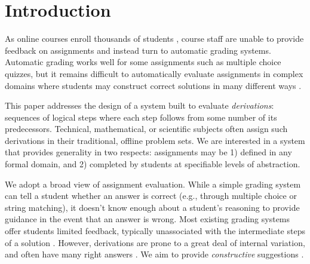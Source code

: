 \documentclass{sigchi}
\begin{document}








 

\section{Introduction}
As online courses enroll thousands of students \cite{enroll}, course staff are unable to provide feedback on assignments and instead turn to automatic grading systems. Automatic grading works well for some assignments such as multiple choice quizzes, but it remains difficult to automatically evaluate assignments in complex domains where students may construct correct solutions in many different ways \cite{automated-scoring-design, automated-grading}. 

This paper addresses the design of a system built to evaluate \textit{derivations}: sequences of logical steps where each step follows from some number of its predecessors. Technical, mathematical, or scientific subjects often assign such derivations in their traditional, offline problem sets. We are interested in a system that provides generality in two respects: assignments may be 1) defined in any formal domain, and 2) completed by students at specifiable levels of abstraction.

We adopt a broad view of assignment evaluation. While a simple grading system can tell a student whether an answer is correct (e.g., through multiple choice or string matching), it doesn't know enough about a student's reasoning to provide guidance in the event that an answer is wrong. Most existing grading systems offer students limited feedback, typically unassociated with the intermediate steps of a solution \cite{coursera-doc}. However, derivations are prone to a great deal of internal variation, and often have many right answers \cite{derivation-scoring}. We aim to provide \textit{constructive} suggestions \cite{personalized-feedback}.
\end{document}
